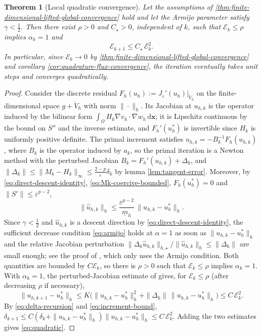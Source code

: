 \documentclass[11pt,pdflatex,sn-mathphys-num]{sn-jnl}
\theoremstyle{thmstyleone}%
\newtheorem{theorem}{Theorem}%
\theoremstyle{thmstyletwo}%
\theoremstyle{thmstylethree}%
\newcommand{\bs}[1]{\ensuremath{\boldsymbol{#1}}}
\begin{document}
\begin{theorem}[Local quadratic convergence]\label{thm:local-quadratic}
Let the assumptions of
\cref{thm:finite-dimensional-lifted-global-convergence} hold and let the
Armijo parameter satisfy $\gamma<\tfrac12$. Then there exist $\rho>0$ and
$C_\star>0$, independent of $k$, such that $\mathcal E_k\le\rho$ implies
$\alpha_k=1$ and
\begin{equation}\label{eq:quadratic}
  \mathcal E_{k+1}\le C_\star\,\mathcal E_k^2 .
\end{equation}
In particular, since $\mathcal E_k\to0$ by \cref{thm:finite-dimensional-lifted-global-convergence} and corollary \ref{cor:quadrature-flux-convergence}, the iteration eventually takes unit steps and converges quadratically.
\end{theorem}
\begin{proof}
Consider the discrete residual $F_h(u_h):=J_\varepsilon'(u_h)|_{\mathring V_h}$ on the finite-dimensional space $g+\mathring V_h$ with norm $\|\cdot\|_h$. Its Jacobian at $u_{h,k}$ is the operator induced by the bilinear form $\int_\Omega H_k\nabla v_h\cdot\nabla w_h\,\mathrm{d}\bs x$; it is Lipschitz continuous by the bound on $S''$ and the inverse estimate, and $F_h'(u_h^*)$ is invertible since $H_k$ is uniformly positive definite. The primal increment satisfies $\hat u_{h,k}=-B_k^{-1}F_h(u_{h,k})$, where $B_k$ is the operator induced by $a_k$, so the primal iteration is a Newton method with the perturbed Jacobian $B_k=F_h'(u_{h,k})+\Delta_k$, and $\|\Delta_k\|\le\|M_k-H_k\|_\infty\le\frac{2-p}{\varepsilon}\delta_k$ by lemma \ref{lem:tangent-error}. Moreover, by \eqref{eq:direct-descent-identity}, \eqref{eq:Mk-coercive-bounded}, $F_h(u_h^*)=0$ and $\|S'\|\le\varepsilon^{p-2}$,
\begin{equation}\label{eq:increment-bound}
  \|\hat u_{h,k}\|_h\le\frac{\varepsilon^{p-2}}{\underline m_h}\,\|u_{h,k}-u_h^*\|_h .
\end{equation}
Since $\gamma<\tfrac12$ and $\hat u_{h,k}$ is a descent direction by \eqref{eq:direct-descent-identity}, the sufficient decrease condition \eqref{eq:armijo} holds at $\alpha=1$ as soon as $\|u_{h,k}-u_h^*\|_h$ and the relative Jacobian perturbation $\|\Delta_k\hat u_{h,k}\|_{h,\star}/\|\hat u_{h,k}\|_h\le\|\Delta_k\|$ are small enough; see the proof of \cite[Theorem~3.6]{NocedalWright06}, which only uses the Armijo condition. Both quantities are bounded by $C\mathcal E_k$, so there is $\rho>0$ such that $\mathcal E_k\le\rho$ implies $\alpha_k=1$.
With $\alpha_k=1$, the perturbed-Jacobian estimate of \cite[Theorem~5.4.1]{Kelley95} gives, for $\mathcal E_k\le\rho$ (after decreasing $\rho$ if necessary),
\begin{equation*}
  \|u_{h,k+1}-u_h^*\|_h\le K\bigl(\|u_{h,k}-u_h^*\|_h^2+\|\Delta_k\|\,\|u_{h,k}-u_h^*\|_h\bigr)\le C\,\mathcal E_k^2 .
\end{equation*}
By \eqref{eq:delta-recursion} and \eqref{eq:increment-bound},
$\delta_{k+1}\le C(\delta_k+\|u_{h,k}-u_h^*\|_h)\|u_{h,k}-u_h^*\|_h\le C\,\mathcal E_k^2$.
Adding the two estimates gives \eqref{eq:quadratic}.
\end{proof}
\end{document}
